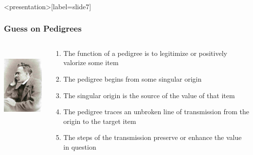 \begin{frame}<presentation>[label=slide7]
    \frametitle{Guess on Pedigrees}
        \begin{columns}
            \begin{column}{3cm}
                \includegraphics[height=4cm]{../../../graphics/nietzsche.jpg}
            \end{column}
            \begin{column}{7cm}
                \begin{enumerate}
                    \item The function of a pedigree is to legitimize or positively valorize some item
                    \item The pedigree begins from some singular origin
                    \item The singular origin is the source of the value of that item
                    \item The pedigree traces an unbroken line of transmission from the origin to the target item
                    \item The steps of the transmission preserve or enhance the value in question
                \end{enumerate}
            \end{column}
        \end{columns}
\end{frame}




